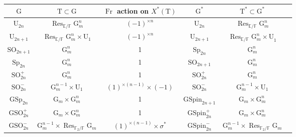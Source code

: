 \documentclass[12pt, reqno]{amsart}
\theoremstyle{definition}
\theoremstyle{definition}
\theoremstyle{definition}
\newcommand{\SO}{\mathrm{SO}}
\newcommand{\GSO}{\mathrm{GSO}}
\newcommand{\Sp}{\mathrm{Sp}}
\newcommand{\GSp}{\mathrm{GSp}}
\newcommand{\UnitaryGroup}{\mathrm{U}}
\newcommand{\finiteField}{\mathbb{F}}
\newcommand{\quadraticExtension}{\mathbb{E}}
\newcommand{\finiteFieldExtension}[1]{\finiteField_{#1}}
\newcommand{\Frobenius}{\operatorname{Fr}}
\newcommand{\restrictionOfScalars}[3]{\operatorname{Res}_{#1 \slash #2}{#3}}
\newcommand{\multiplcativeScheme}{\algebraicGroup{G}_m}
\newcommand{\algebraicGroup}[1]{\boldsymbol{\mathrm{#1}}}
\newcommand{\CharacterLattice}[1]{X^{\ast}\left(#1\right)}
\begin{document}
\begin{center}
	\begin{tabular}{|c|c|c|c|c|c|} \hline
		$\algebraicGroup{G}$ & $\algebraicGroup{T} \subset \algebraicGroup{G}$ & $\Frobenius$ action on $\CharacterLattice{\algebraicGroup{T}}$ & $\algebraicGroup{G}^{\ast}$ & $\algebraicGroup{T}^{\ast} \subset \algebraicGroup{G}^{\ast}$ \tabularnewline \hline \hline
		$\algebraicGroup{\UnitaryGroup}_{2n}$ & $\restrictionOfScalars{\quadraticExtension}{\finiteField}{\multiplcativeScheme^{n}}$ & $\left(-1\right)^{\times n}$ & $\algebraicGroup{\UnitaryGroup}_{2n}$ &  $\restrictionOfScalars{\quadraticExtension}{\finiteField}{\multiplcativeScheme^{n}}$ \tabularnewline \hline
		$\algebraicGroup{\UnitaryGroup}_{2n+1}$ & $\restrictionOfScalars{\quadraticExtension}{\finiteField}{\multiplcativeScheme^{n}} \times \algebraicGroup{\UnitaryGroup}_1$ & $\left(-1\right)^{\times n}$ & $\algebraicGroup{\UnitaryGroup}_{2n+1}$ &  $\restrictionOfScalars{\quadraticExtension}{\finiteField}{\multiplcativeScheme^{n} \times \algebraicGroup{\UnitaryGroup}}_1$ \tabularnewline \hline		 				 
		$\algebraicGroup{\SO}_{2n+1}$ & $\multiplcativeScheme^n$ & 1 &$\algebraicGroup{\Sp}_{2n}$ &  $\multiplcativeScheme^n$ \tabularnewline \hline
		$\algebraicGroup{\Sp}_{2n}$ & $\multiplcativeScheme^n$ & 1 &$\algebraicGroup{\SO}_{2n+1}$ & $\multiplcativeScheme^n$ \tabularnewline \hline		 
		$\algebraicGroup{\SO}^{+}_{2n}$ & $\multiplcativeScheme^n$ & 1 &$\algebraicGroup{\SO}^{+}_{2n}$ &  $\multiplcativeScheme^n$ \tabularnewline \hline
		$\algebraicGroup{\SO}^{-}_{2n}$ & $\multiplcativeScheme^{n-1} \times \algebraicGroup{\UnitaryGroup}_1$ & $\left(1\right)^{\times {\left(n-1\right)}} \times \left(-1\right)$ &$\algebraicGroup{\SO}^{-}_{2n}$ &  $\multiplcativeScheme^{n-1} \times \algebraicGroup{\UnitaryGroup}_1$ \tabularnewline \hline
		$\algebraicGroup{\GSp}_{2n}$ & $\multiplcativeScheme \times \multiplcativeScheme^{n}$ & 1 &$\algebraicGroup{GSpin}_{2n+1}$ &  $\multiplcativeScheme \times \multiplcativeScheme^{n}$ \tabularnewline \hline
		$\algebraicGroup{\GSO}^{+}_{2n}$ & $\multiplcativeScheme \times \multiplcativeScheme^{n}$ & 1 & $\algebraicGroup{GSpin}_{2n}^{+}$ &  $\multiplcativeScheme \times \multiplcativeScheme^{n}$ \tabularnewline \hline
		$\algebraicGroup{\GSO}^{-}_{2n}$ & $\multiplcativeScheme^{n-1} \times \restrictionOfScalars{\finiteFieldExtension{2}}{\finiteField}{\multiplcativeScheme}$ & $\left(1\right)^{\times {\left(n-1\right)}} \times \sigma^{\ast}$ & $\algebraicGroup{GSpin}_{2n}^{-}$ &  $\multiplcativeScheme^{n-1} \times \restrictionOfScalars{\finiteFieldExtension{2}}{\finiteField}{\multiplcativeScheme}$ \tabularnewline \hline
	\end{tabular}
\end{center}
\end{document}
